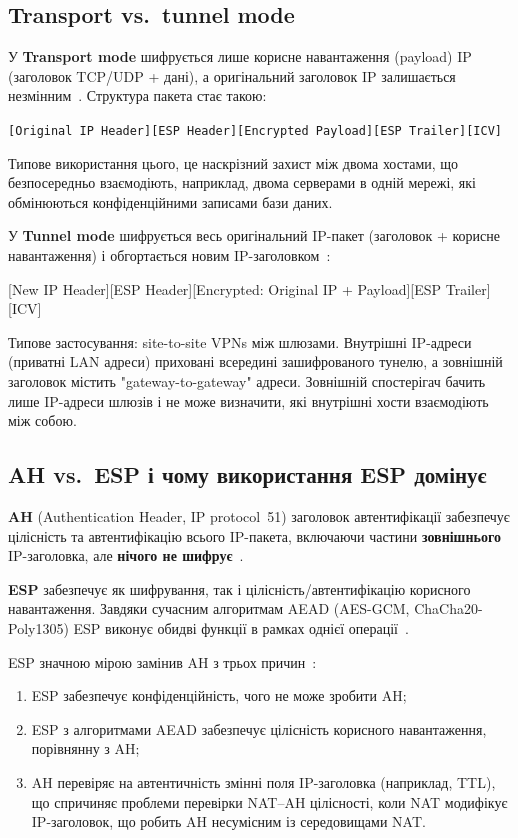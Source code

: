 \subsection*{Transport vs.\ tunnel mode}

У \textbf{Transport mode} шифрується лише корисне навантаження (payload) IP (заголовок TCP/UDP + дані), а 
оригінальний заголовок IP залишається незмінним~\cite{rfc4303}. Структура пакета стає такою:

\noindent\texttt{[Original IP Header][ESP Header][Encrypted Payload][ESP Trailer][ICV]}

Типове використання цього, це наскрізний захист між двома хостами, що безпосередньо взаємодіють, наприклад, двома
серверами в одній мережі, які обмінюються конфіденційними записами бази даних.

У \textbf{Tunnel mode} шифрується весь оригінальний IP-пакет (заголовок + корисне навантаження) і обгортається 
новим IP-заголовком~\cite{rfc4303}:

\noindent\texttt\scriptsize{[New IP Header][ESP Header][Encrypted: Original IP + Payload][ESP Trailer][ICV]}

Типове застосування: site-to-site VPNs між шлюзами. Внутрішні IP-адреси (приватні LAN адреси) приховані всередині 
зашифрованого тунелю, а зовнішній заголовок містить "gateway-to-gateway"{} адреси. Зовнішній спостерігач бачить 
лише IP-адреси шлюзів і не може визначити, які внутрішні хости взаємодіють між собою.

\subsection*{AH vs.\ ESP і чому використання ESP домінує}

\textbf{AH} (Authentication Header, IP protocol~51) заголовок автентифікації забезпечує цілісність та автентифікацію 
всього IP-пакета, включаючи частини \textbf{зовнішнього} IP-заголовка, але \textbf{нічого не шифрує}~\cite{rfc4302}.

\textbf{ESP} забезпечує як шифрування, так і цілісність/автентифікацію корисного навантаження. Завдяки сучасним 
алгоритмам AEAD (AES-GCM, ChaCha20-Poly1305) ESP виконує обидві функції в рамках однієї операції~\cite{rfc4303}.

\noindent ESP значною мірою замінив AH з трьох причин~\cite{nist_sp800_77r1}:

\begin{enumerate}
    \item ESP забезпечує конфіденційність, чого не може зробити AH;
    \item ESP з алгоритмами AEAD забезпечує цілісність корисного навантаження, порівнянну з AH;
    \item AH перевіряє на автентичність змінні поля IP-заголовка (наприклад, TTL), що спричиняє проблеми перевірки 
        NAT--AH цілісності, коли NAT модифікує IP-заголовок, що робить AH несумісним із середовищами NAT.
\end{enumerate}

